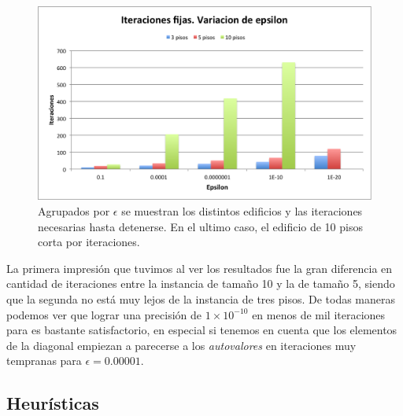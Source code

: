 \documentclass[a4paper]{article}
\begin{document}
\begin{figure}[H]
  \centering
  \includegraphics[scale=0.75]{graficos/1-Cantidad_iteraciones_por_piso.png}
  \caption{Agrupados por $\epsilon$ se muestran los distintos edificios y las iteraciones necesarias hasta detenerse. En el ultimo caso, el edificio de 10 pisos corta por iteraciones.}
\end{figure}

La primera impresión que tuvimos al ver los resultados fue la gran diferencia en cantidad de iteraciones entre la instancia de tamaño 10 y la de tamaño 5, siendo que la segunda no está muy lejos de la instancia de tres pisos. De todas maneras podemos ver que lograr una precisión de $1\times 10^{-10}$ en menos de mil iteraciones para es bastante satisfactorio, en especial si tenemos en cuenta que los elementos de la diagonal empiezan a parecerse a los \textit{autovalores} en iteraciones muy tempranas para $\epsilon = 0.00001$.

\subsection{Heurísticas}


\end{document}
